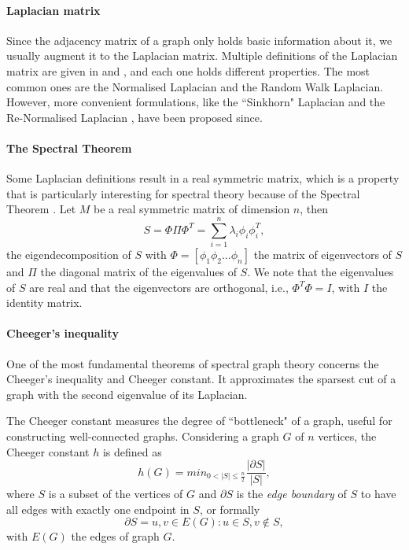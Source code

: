 \paragraph{Laplacian matrix}
Since the adjacency matrix of a graph only holds basic information about it, we usually augment it to the Laplacian matrix.
Multiple definitions of the Laplacian matrix are given in \cite{chung_spectral_1997} and \cite{siam_slides_2016}, and each one holds different properties.
The most common ones are the Normalised Laplacian and the Random Walk Laplacian.
However, more convenient formulations, like the ``Sinkhorn" Laplacian \cite{milanfar_symmetrizing_2013} and the Re-Normalised Laplacian \cite{siam_slides_2016}, have been proposed since.

\paragraph{The Spectral Theorem}
Some Laplacian definitions result in a real symmetric matrix, which is a property that is particularly interesting for spectral theory because of the Spectral Theorem \cite{zhang_spectral_2010}.
Let \(M\) be a real symmetric matrix of dimension \(n\), then
\[S = \Phi \Pi \Phi^T = \sum_{i=1}^n \lambda_i \phi_i \phi_i^T,\]
the eigendecomposition of \(S\) with \(\Phi = [\phi_1 \phi_2 \dots \phi_n ]\) the matrix of eigenvectors of \(S\) and \(\Pi\) the diagonal matrix of the eigenvalues of \(S\).
We note that the eigenvalues of \(S\) are real and that the eigenvectors are orthogonal, i.e., \(\Phi^T\Phi = I\), with \(I\) the identity matrix.

\paragraph{Cheeger's inequality}
One of the most fundamental theorems of spectral graph theory concerns the Cheeger's inequality and Cheeger constant.
It approximates the sparsest cut of a graph with the second eigenvalue of its Laplacian.

The Cheeger constant \cite{cheeger_lower_1969} measures the degree of ``bottleneck" of a graph, useful for constructing well-connected graphs.
Considering a graph \(G\) of \(n\) vertices, the Cheeger constant \(h\) is defined as
\[h(G) = min_{0 < |S| \le \frac{n}{2}} \frac{|\partial S|}{|S|},\]
where \(S\) is a subset of the vertices of \(G\) and \(\partial S\) is the \textit{edge boundary} of \(S\) to have all edges with exactly one endpoint in \(S\), or formally
\[\partial S = {{u, v} \in E(G) : u \in S, v \notin S},\]
with \(E(G)\) the edges of graph \(G\).

